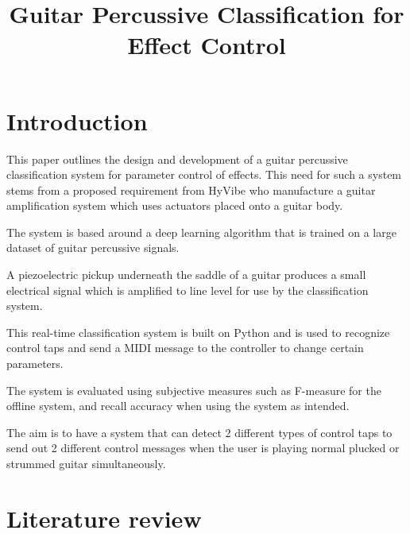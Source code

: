 \documentclass[conference]{IEEEtran}
\begin{document}
\title{Guitar Percussive Classification for Effect Control\\

}

\author{
}

\maketitle

\begin{abstract}

\end{abstract}
 
 



\section{Introduction}
This paper outlines the design and development of a guitar percussive classification system for parameter control of effects. This need for such a system stems from a proposed
requirement from HyVibe who manufacture a guitar amplification system which uses actuators placed onto a guitar body.

The system is based around a deep learning algorithm that is trained on a large dataset of guitar percussive signals. 

A piezoelectric pickup underneath the saddle of a guitar produces a small electrical signal which is amplified to line level for use by the classification system.

This real-time classification system is built on Python and is used to recognize control taps and send a MIDI message to the controller to change certain parameters.

The system is evaluated using subjective measures such as F-measure for the offline system, and recall accuracy when using the system as intended.

The aim is to have a system that can detect 2 different types of control taps to send out 2 different control messages when the user is playing normal plucked or strummed guitar simultaneously.


\section{Literature review}
\end{document}
